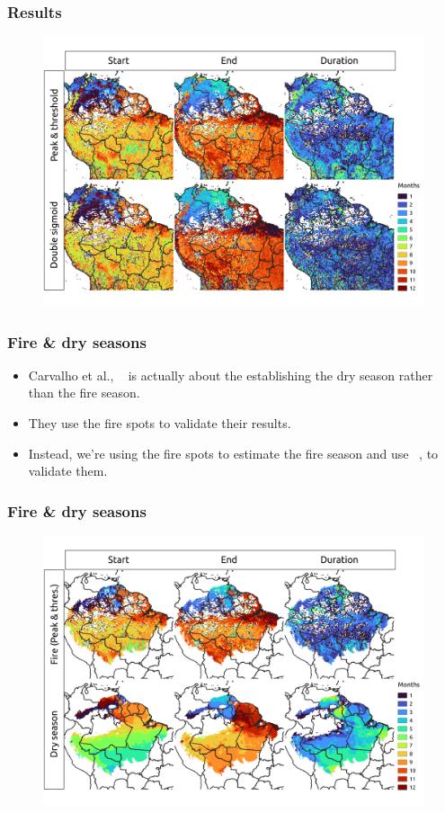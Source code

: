 \documentclass[aspectratio=169]{beamer}
\begin{document}
\begin{frame}
    \frametitle{Results}
    \begin{figure}[h]
        \includegraphics[width=0.80\linewidth]
        {./images/pthres_vs_dsig.png}
    \end{figure}
\end{frame}

\begin{frame}
    \frametitle{Fire \& dry seasons}
    \begin{itemize}
        \item Carvalho et al., ~\cite{carvalho2021} is actually about the
            establishing the dry season rather than the fire season.
        \item They use the fire spots to validate their results.
        \item Instead, we're using the fire spots to estimate the fire season
            and use ~\cite{carvalho2021}, to validate them.
    \end{itemize}
\end{frame}

\begin{frame}
    \frametitle{Fire \& dry seasons}
    \begin{figure}[h]
        \includegraphics[width=0.80\linewidth]
        {./images/pthres_vs_carvalho2021.png}
    \end{figure}
\end{frame}
\end{document}
